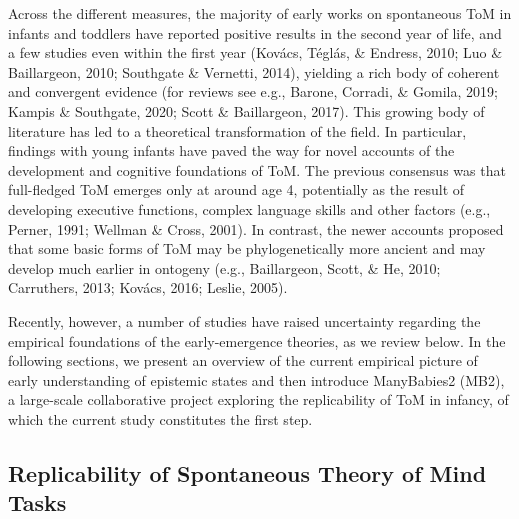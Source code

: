 \documentclass[
  english,
  man,floatsintext]{apa6}
\begin{document}
Across the different measures, the majority of early works on spontaneous ToM in infants and toddlers have reported positive results in the second year of life, and a few studies even within the first year (Kovács, Téglás, \& Endress, 2010; Luo \& Baillargeon, 2010; Southgate \& Vernetti, 2014), yielding a rich body of coherent and convergent evidence (for reviews see e.g., Barone, Corradi, \& Gomila, 2019; Kampis \& Southgate, 2020; Scott \& Baillargeon, 2017). This growing body of literature has led to a theoretical transformation of the field. In particular, findings with young infants have paved the way for novel accounts of the development and cognitive foundations of ToM. The previous consensus was that full-fledged ToM emerges only at around age 4, potentially as the result of developing executive functions, complex language skills and other factors (e.g., Perner, 1991; Wellman \& Cross, 2001). In contrast, the newer accounts proposed that some basic forms of ToM may be phylogenetically more ancient and may develop much earlier in ontogeny (e.g., Baillargeon, Scott, \& He, 2010; Carruthers, 2013; Kovács, 2016; Leslie, 2005).

Recently, however, a number of studies have raised uncertainty regarding the empirical foundations of the early-emergence theories, as we review below. In the following sections, we present an overview of the current empirical picture of early understanding of epistemic states and then introduce ManyBabies2 (MB2), a large-scale collaborative project exploring the replicability of ToM in infancy, of which the current study constitutes the first step.

\hypertarget{replicability-of-spontaneous-theory-of-mind-tasks}{%
\subsection{Replicability of Spontaneous Theory of Mind Tasks}\label{replicability-of-spontaneous-theory-of-mind-tasks}}
\end{document}
